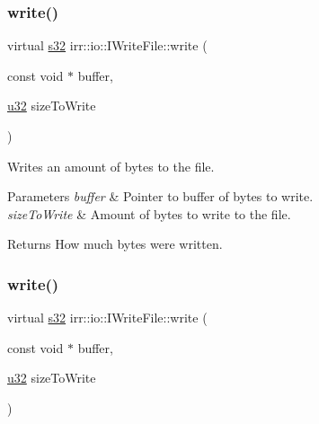 \subsubsection{\texorpdfstring{write()}{write()}\hspace{0.1cm}{\footnotesize\ttfamily [1/2]}}
{\footnotesize\ttfamily virtual \hyperlink{namespaceirr_ac66849b7a6ed16e30ebede579f9b47c6}{s32} irr\+::io\+::\+I\+Write\+File\+::write (\begin{DoxyParamCaption}\item[{const void $\ast$}]{buffer,  }\item[{\hyperlink{namespaceirr_a0416a53257075833e7002efd0a18e804}{u32}}]{size\+To\+Write }\end{DoxyParamCaption})\hspace{0.3cm}{\ttfamily [pure virtual]}}



Writes an amount of bytes to the file. 


\begin{DoxyParams}{Parameters}
{\em buffer} & Pointer to buffer of bytes to write. \\
\hline
{\em size\+To\+Write} & Amount of bytes to write to the file. \\
\hline
\end{DoxyParams}
\begin{DoxyReturn}{Returns}
How much bytes were written. 
\end{DoxyReturn}
\mbox{\label{classirr_1_1io_1_1IWriteFile_a32ce2fb186c4a21fcf3c85adb13c7c77}} 
\subsubsection{\texorpdfstring{write()}{write()}\hspace{0.1cm}{\footnotesize\ttfamily [2/2]}}
{\footnotesize\ttfamily virtual \hyperlink{namespaceirr_ac66849b7a6ed16e30ebede579f9b47c6}{s32} irr\+::io\+::\+I\+Write\+File\+::write (\begin{DoxyParamCaption}\item[{const void $\ast$}]{buffer,  }\item[{\hyperlink{namespaceirr_a0416a53257075833e7002efd0a18e804}{u32}}]{size\+To\+Write }\end{DoxyParamCaption})\hspace{0.3cm}{\ttfamily [pure virtual]}}



